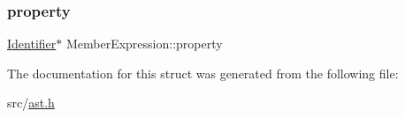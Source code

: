 \mbox{\label{struct_member_expression_aacf14f0ff4ff8cb0cf5346afc3b97470}} 
\subsubsection{\texorpdfstring{property}{property}}
{\footnotesize\ttfamily \hyperlink{struct_identifier}{Identifier}$\ast$ Member\+Expression\+::property}



The documentation for this struct was generated from the following file\+:\begin{DoxyCompactItemize}
\item 
src/\hyperlink{ast_8h}{ast.\+h}\end{DoxyCompactItemize}
